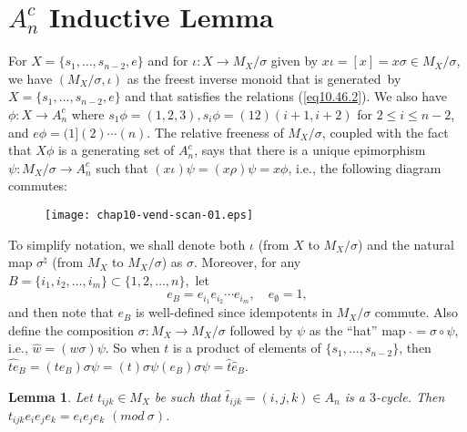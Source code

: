 \documentclass{surv-l}
\numberwithin{equation}{section}
\numberwithin{table}{section}
\numberwithin{figure}{section}
\theoremstyle{plain}
\newtheorem{lemma}[equation]{Lemma}
\theoremstyle{definition}
\begin{document}
\section{$A_{n}^{c}$ Inductive Lemma}\label{sec10.48}

For $X=\{s_{1},\ldots, s_{n-2}, e\}$ and for $\iota : X\rightarrow
M_{X}/\sigma$ given by $ x\iota =[x]=x\sigma\in M_{X}/\sigma$, we
have $(M_{X}/\sigma, \iota)$ as the freest inverse monoid that is
generated~by $X=\{s_{1},\ldots, s_{n-2}, e\}$ and that satisfies
the relations (\ref{eq10.46.2}). We also have $\phi : X\rightarrow
A_{n}^{c}$ where $s_{1}\phi=(1,2,3), s_{i}\phi=(12)(i+1, i+2)$ for
$2\leq i\leq n -2$, and $e\phi =(1](2)\cdots(n)$. The relative
freeness of $M_{X}/\sigma$, coupled with the fact that $X\phi$
is a generating set of $A_{n}^{c}$, says that there is a unique
epimorphism $\psi : M_{X}/\sigma\rightarrow A_{n}^{c}$ such that
$(x\iota)\psi=(x\rho)\psi=x\phi$, i.e., the following diagram
commutes:
\begin{figure}[!h]
\texttt{[image: chap10-vend-scan-01.eps]}
\end{figure}

\noindent To simplify notation, we shall denote both $\iota$ (from $X$
to $M_{X}/\sigma$) and the natural map $\sigma^{\natural}$
(from $M_{X}$ to $M_{X}/\sigma$) as $\sigma$. Moreover, for
any $B=\{i_{1}, i_{2},\ldots, i_{m}\} \subset\{1,2,\ldots,
n\}$,~let
\[
e_{B}=e_{i_{1}}e_{i_{2}}\cdots e_{i_{m}},\quad e_{\emptyset}=1,
\]
and then note that $e_{B}$ is well-defined since idempotents in
$M_{X}/\sigma$ commute. Also define the composition $\sigma :
M_{X}\rightarrow M_{X}/\sigma$ followed by $\psi$ as the ``hat''
map $\ \widehat{} =\sigma\circ\psi$, i.e.,
$\widehat{w}=(w\sigma)\psi$. So when $t$ is a product of elements
of $\{s_{1},\ldots, s_{n-2}\}$, then
$\widehat{te}_{B}=(te_{B})\sigma\psi=(t)\sigma\psi(e_{B})\sigma\psi=\widehat{t}\widehat{e}_{B}$.

\begin{lemma}\label{lem10.48.1}
Let $t_{ijk}\in M_{X}$ be such that $\widehat{t}_{ijk}=(i, j,
k)\in A_{n}$ is a $3$-cycle. Then $t_{ijk}e_{i}e_{j}e_{k}
=e_{i}e_{j}e_{k}$ $(mod\ \sigma)$.
\end{lemma}
\end{document}

